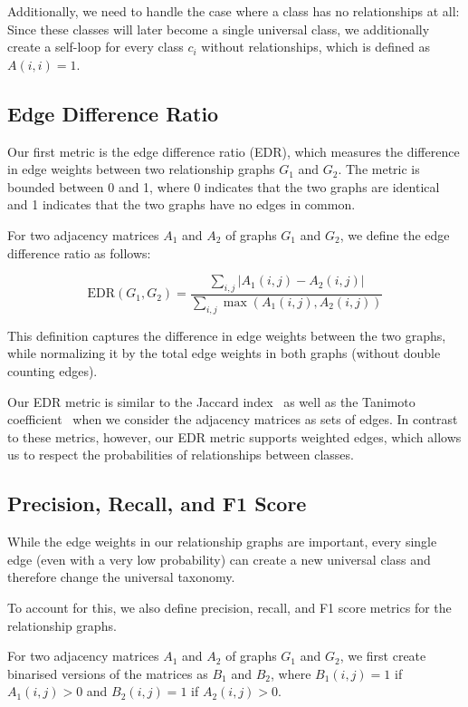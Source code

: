 Additionally, we need to handle the case where a class has no relationships at all:
Since these classes will later become a single universal class,
we additionally create a self-loop for every class $c_i$ without relationships,
which is defined as $A(i,i) = 1$.

\subsection{Edge Difference Ratio} \label{sec:edr}

Our first metric is the edge difference ratio (EDR),
which measures the difference in edge weights between two relationship graphs $G_1$ and $G_2$.
The metric is bounded between 0 and 1, where 0 indicates that the two graphs are identical
and 1 indicates that the two graphs have no edges in common.

For two adjacency matrices $A_1$ and $A_2$ of graphs $G_1$ and $G_2$,
we define the edge difference ratio as follows:

\begin{equation}
    \text{EDR}(G_1, G_2) = \frac{\sum_{i,j} |A_1(i,j) - A_2(i,j)|}{\sum_{i,j} \max(A_1(i,j), A_2(i,j))}
\end{equation}

This definition captures the difference in edge weights between the two graphs,
while normalizing it by the total edge weights in both graphs (without double counting edges).

Our EDR metric is similar to the Jaccard index~\cite{jaccard_distribution_1912} as well as the Tanimoto coefficient~\cite{tanimoto_elementary_1958}
when we consider the adjacency matrices as sets of edges.
In contrast to these metrics, however, our EDR metric supports weighted edges,
which allows us to respect the probabilities of relationships between classes.

\subsection{Precision, Recall, and F1 Score}

While the edge weights in our relationship graphs are important,
every single edge (even with a very low probability) can create a new universal class
and therefore change the universal taxonomy.

To account for this, we also define precision, recall, and F1 score metrics
for the relationship graphs.

For two adjacency matrices $A_1$ and $A_2$ of graphs $G_1$ and $G_2$,
we first create binarised versions of the matrices as $B_1$ and $B_2$,
where $B_1(i,j) = 1$ if $A_1(i,j) > 0$ and $B_2(i,j) = 1$ if $A_2(i,j) > 0$.

